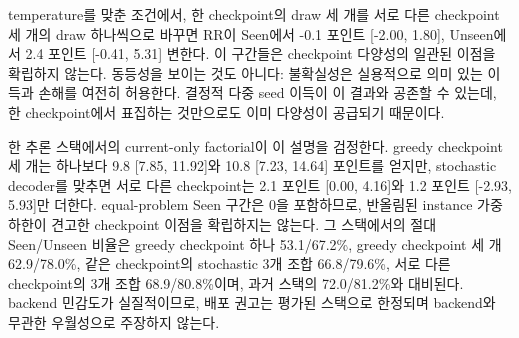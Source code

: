 \documentclass[10pt,conference]{IEEEtran}
\begin{document}
temperature를 맞춘 조건에서, 한 checkpoint의 draw 세 개를 서로 다른 checkpoint 세 개의 draw 하나씩으로 바꾸면 RR이 Seen에서 -0.1 포인트 [-2.00, 1.80], Unseen에서 2.4 포인트 [-0.41, 5.31] 변한다. 이 구간들은 checkpoint 다양성의 일관된 이점을 확립하지 않는다. 동등성을 보이는 것도 아니다: 불확실성은 실용적으로 의미 있는 이득과 손해를 여전히 허용한다. 결정적 다중 seed 이득이 이 결과와 공존할 수 있는데, 한 checkpoint에서 표집하는 것만으로도 이미 다양성이 공급되기 때문이다.

한 추론 스택에서의 current-only factorial이 이 설명을 검정한다. greedy checkpoint 세 개는 하나보다 9.8 [7.85, 11.92]와 10.8 [7.23, 14.64] 포인트를 얻지만, stochastic decoder를 맞추면 서로 다른 checkpoint는 2.1 포인트 [0.00, 4.16]와 1.2 포인트 [-2.93, 5.93]만 더한다. equal-problem Seen 구간은 0을 포함하므로, 반올림된 instance 가중 하한이 견고한 checkpoint 이점을 확립하지는 않는다. 그 스택에서의 절대 Seen/Unseen 비율은 greedy checkpoint 하나 53.1/67.2\%, greedy checkpoint 세 개 62.9/78.0\%, 같은 checkpoint의 stochastic 3개 조합 66.8/79.6\%, 서로 다른 checkpoint의 3개 조합 68.9/80.8\%이며, 과거 스택의 72.0/81.2\%와 대비된다. backend 민감도가 실질적이므로, 배포 권고는 평가된 스택으로 한정되며 backend와 무관한 우월성으로 주장하지 않는다.
\end{document}
